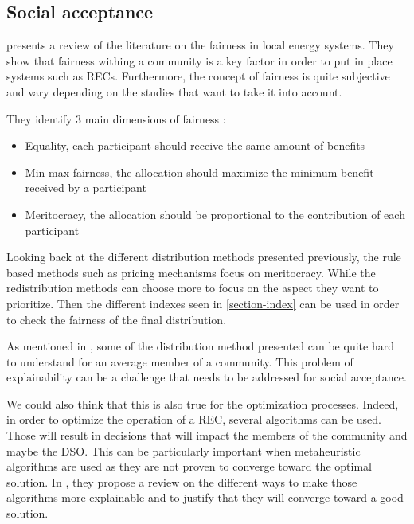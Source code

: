 \documentclass[12pt,a4paper]{article}
\begin{document}
\subsection{Social acceptance}
\cite{article_8} presents a review of the literature on the fairness in local energy systems. They show that fairness withing a community is a key factor in order to put in place systems such as RECs. Furthermore, the concept of fairness is quite subjective and vary depending on the studies that want to take it into account.

They identify 3 main dimensions of fairness : 
\begin{itemize}
    \item {Equality, each participant should receive the same amount of benefits}
    \item {Min-max fairness, the allocation should maximize the minimum benefit received by a participant}
    \item {Meritocracy, the allocation should be proportional to the contribution of each participant}
\end{itemize}

Looking back at the different distribution methods presented previously, the rule based methods such as pricing mechanisms focus on meritocracy. While the redistribution methods can choose more to focus on the aspect they want to prioritize. Then the different indexes seen in \ref{section-index} can be used in order to check the fairness of the final distribution.

As mentioned in \cite{these_new}, some of the distribution method presented can be quite hard to understand for an average member of a community. This problem of explainability can be a challenge that needs to be addressed for social acceptance.

We could also think that this is also true for the optimization processes. Indeed, in order to optimize the operation of a REC, several algorithms can be used. Those will result in decisions that will impact the members of the community and maybe the DSO. This can be particularly important when metaheuristic algorithms are used as they are not proven to converge toward the optimal solution. In \cite{XAI}, they propose a review on the different ways to make those algorithms more explainable and to justify that they will converge toward a good solution.


\end{document}

